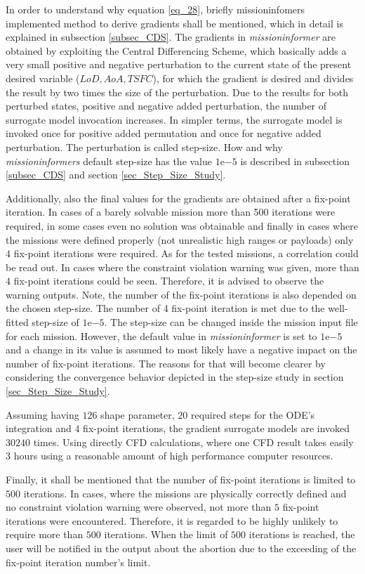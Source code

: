 In order to understand why equation \eqref{eq_28},
briefly 
missioninfomers implemented method to derive 
gradients shall be mentioned, which in 
detail is explained in subsection \ref{subsec_CDS}.
The gradients in \emph{missioninformer} are 
obtained by exploiting the Central Differencing 
Scheme, which basically adds a very small 
positive and negative perturbation to 
the current state of the present 
desired variable ($LoD, AoA, TSFC$), for which 
the gradient is desired and divides the result 
by two times the size of the perturbation.
Due to the results for both perturbed states, 
positive and negative 
added perturbation, the number 
of surrogate model invocation increases. In simpler terms, 
the surrogate model is invoked once for positive 
added permutation and once for negative added 
perturbation. The perturbation is called step-size. 
How and why \emph{missioninformers} default step-size 
has the value $1\mathrm{e}{-5}$ is described in 
subsection \ref{subsec_CDS} 
and  section
\ref{sec_Step_Size_Study}.\newline

Additionally, 
also the final values for the gradients 
are obtained after a fix-point iteration.
In cases of a barely solvable mission more than 
500 iterations were required, in some 
cases even no solution was obtainable and 
finally in cases where the missions were 
defined properly (not unrealistic high ranges 
or payloads) only $4$ fix-point 
iterations were required. As for the  
tested missions, a correlation could be read 
out. In cases where the constraint violation  
warning was given, more than $4$ fix-point 
iterations could be seen. Therefore, it 
is advised to observe the warning outputs.
Note, the number of the fix-point iterations is also 
depended on the chosen step-size. The number of 
$4$ fix-point iteration is met due to 
the well-fitted step-size of $1\mathrm{e}{-5}$.
The step-size can be changed inside 
the mission input file for each mission. However,
the default value in \emph{missioninformer} is set 
to $1\mathrm{e}{-5}$ and a 
change in its value is assumed to most likely 
have a negative impact on the number 
of fix-point iterations. The reasons for that 
will become clearer
by considering the convergence behavior 
depicted in the step-size study 
in section \ref{sec_Step_Size_Study}.\newline 


Assuming having $126$ shape parameter, $20$ required 
steps for the ODE's integration and $4$ fix-point
iterations, the gradient 
surrogate models are invoked $30240$ times.
Using directly CFD calculations, where one CFD result 
takes easily 3 hours using a 
reasonable amount of high performance 
computer resources.  


Finally, 
it shall be mentioned that the number of fix-point 
iterations is limited to $500$ iterations. In cases, 
where the missions are physically correctly defined 
and no constraint violation warning were observed,
not more than $5$ fix-point iterations were encountered. 
Therefore, it is regarded to be highly unlikely to require 
more than $500$ iterations. When the limit of $500$ iterations 
is reached, the user will be notified in the output 
about the abortion due to the exceeding of the  fix-point 
iteration number's limit. 
